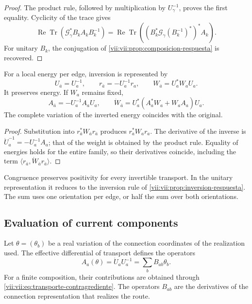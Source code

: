 \begin{proof}
The product rule, followed by multiplication by
\(U_\gamma^{-1}\), proves the first equality. Cyclicity of the
trace gives
\[
 \operatorname{Re}\operatorname{Tr}
  (\mathcal G_\gamma^*B_kA_kB_k^{-1})
 =\operatorname{Re}\operatorname{Tr}
  ((B_k^*\mathcal G_\gamma(B_k^{-1})^*)^*A_k).
\]
For unitary \(B_k\), the conjugation of
\ref{vii:vii:prop:composicion-respuesta} is recovered.
\end{proof}

\begin{proposition}
\label{vii:vii:prop:inversion-congruencia}
For a local energy per edge, inversion is represented by
\begin{equation}
 U_{\bar a}=U_a^{-1},\qquad
 r_{\bar a}=-U_a^{-1}r_a,\qquad
 W_{\bar a}=U_a^*W_aU_a.
 \label{vii:vii:eq:inversion-peso-general}
\end{equation}
It preserves energy. If \(W_a\) remains fixed,
\[
 A_{\bar a}=-U_a^{-1}A_aU_a,\qquad
 \dot W_{\bar a}=U_a^*(A_a^*W_a+W_aA_a)U_a.
\]
The complete variation of the inverted energy coincides with the original.
\end{proposition}

\begin{proof}
Substitution into \(r_{\bar a}^*W_{\bar a}r_{\bar a}\)
produces \(r_a^*W_ar_a\). The derivative of the inverse is
\(\dot U_a^{-1}=-U_a^{-1}A_a\); that of the weight is obtained by
the product rule. Equality of energies holds for the entire
family, so their derivatives coincide, including the term
\(\langle r_{\bar a},\dot W_{\bar a}r_{\bar a}\rangle\).
\end{proof}

Congruence preserves positivity for every invertible transport.
In the unitary representation it reduces to the inversion rule of
\ref{vii:vii:prop:inversion-respuesta}. The sum uses one orientation
per edge, or half the sum over both orientations.

\subsection{Evaluation of current components}

Let \(\theta=(\theta_b)\) be a real variation of the connection
coordinates of the realization used. The effective differential of
transport defines the operators
\begin{equation}
 A_a(\theta)=\dot U_aU_a^{-1}
     =\sum_bB_{ab}\theta_b.
 \label{vii:vii:eq:diferencial-conexion-transporte}
\end{equation}
For a finite composition, their contributions are obtained through
\eqref{vii:vii:eq:transporte-contragrediente}. The operators
\(B_{ab}\) are the derivatives of the connection representation that
realizes the route.

